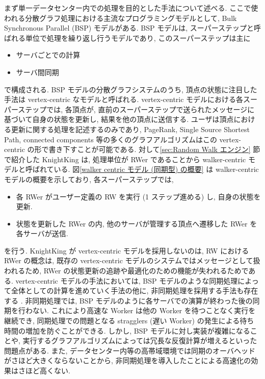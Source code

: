 まず単一データセンター内での処理を目的とした手法について述べる. ここで使われる分散グラフ処理における主流なプログラミングモデルとして, Bulk Synchronous Parallel (BSP) モデルがある. BSP モデルは, スーパーステップと呼ばれる単位で処理を繰り返し行うモデルであり, このスーパーステップは主に
\begin{itemize}
    \item サーバごとでの計算
    \item サーバ間同期
\end{itemize}
で構成される. BSP モデルの分散グラフシステムのうち, 頂点の状態に注目した手法\cite{Pregel}\cite{10.1145/2741948.2741970}\cite{10.5555/2387880.2387883}\cite{10.5555/3026877.3026901}\cite{Gluon}は vertex-centric なモデルと呼ばれる. vertex-centric モデルにおける各スーパーステップでは, 各頂点が, 直前のスーパーステップで送られたメッセージに基づいて自身の状態を更新し, 結果を他の頂点に送信する. ユーザは頂点における更新に関する処理を記述するのみであり, PageRank, Single Source Shortest Path, connected components 等の多くのグラフアルゴリズムはこの vertex-centric の形で書き下すことが可能である. 対して\ref{sec:Random Walk エンジン} 節で紹介した KnightKing は, 処理単位が RWer であることから walker-centric モデルと呼ばれている. 図\ref{walker centric モデル (同期型) の概要} は walker-centric モデルの概要を示しており, 各スーパーステップでは, 
\begin{itemize}
    \item 各 RWer がユーザー定義の RW を実行 (1 ステップ進める) し, 自身の状態を更新.
    \item 状態を更新した RWer の内, 他のサーバが管理する頂点へ遷移した RWer を各サーバが送信.
\end{itemize}
を行う. KnightKing が vertex-centric モデルを採用しないのは, RW における RWer の概念は, 既存の vertex-centric モデルのシステムではメッセージとして扱われるため, RWer の状態更新の追跡や最適化のための機能が失われるためである. vertex-centric モデルの手法においては, BSP モデルのような同期処理によって全体としての計算を進めていく手法の他に, 非同期処理を採用する手法も存在する \cite{BAP}\cite{AAP}\cite{Gluon-Async} .  非同期処理では, BSP モデルのように各サーバでの演算が終わった後の同期を行わない. これにより高速な Worker は他の Worker を待つことなく実行を継続でき, 同期処理での問題となる stragglers (遅い Worker) の発生による待ち時間の増加を防ぐことができる. しかし, BSP モデルに対し実装が複雑になることや, 実行するグラフアルゴリズムによっては冗長な反復計算が増えるといった問題点がある. また, データセンター内等の高帯域環境では同期のオーバヘッドがさほど大きくならないことから, 非同期処理を導入したことによる高速化の効果はさほど高くない. 

